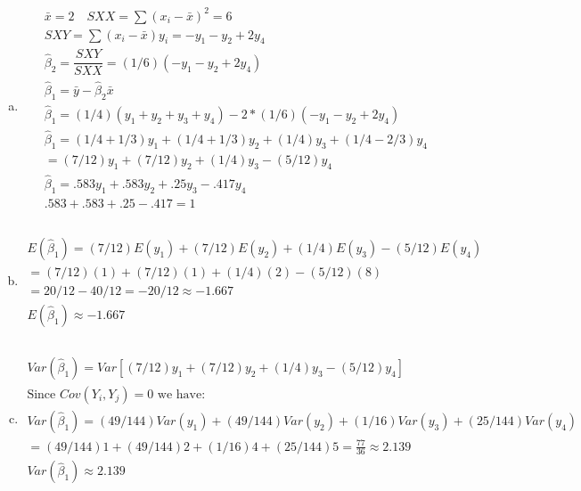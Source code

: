 \documentclass{article}
\newcommand{\hb}{\hat{\beta}}
\newcommand{\bx}{\bar{x}}
\newcommand{\by}{\bar{y}}
\begin{document}
\begin{flushleft}
\begin{enumerate}[(a)]
	
	\item 
\begin{multline*}\\
\bx =2 \quad SXX=\sum(x_i-\bx)^2=6\\
SXY=\sum(x_i-\bx)y_i=-y_1-y_2+2y_4\\
\hb_2=\dfrac{SXY}{SXX}=(1/6)(-y_1-y_2+2y_4)\\
\hb_1=\by-\hb_2 \bx\\
\hb_1=(1/4)(y_1+y_2+y_3+y_4)-2*(1/6)(-y_1-y_2+2y_4)\\
\hb_1=(1/4+1/3)y_1+(1/4+1/3)y_2+(1/4)y_3+(1/4-2/3)y_4\\
=(7/12)y_1+(7/12)y_2+(1/4)y_3-(5/12)y_4\\
\hb_1=.583y_1+.583y_2+.25y_3-.417y_4\\
.583+.583+.25-.417=1\\
\end{multline*}

	\item 
\begin{multline*}\\
E(\hb_1)=(7/12)E(y_1)+(7/12)E(y_2)+(1/4)E(y_3)-(5/12)E(y_4)\\
=(7/12)(1)+(7/12)(1)+(1/4)(2)-(5/12)(8)\\
=20/12-40/12=-20/12\approx -1.667\\
E(\hb_1)\approx -1.667\\
\end{multline*}


\item 
\begin{multline*}\\
Var(\hb_1)=Var[(7/12)y_1+(7/12)y_2+(1/4)y_3-(5/12)y_4]\\
\text{Since } Cov(Y_i,Y_j)=0 \text{ we have:}\\
Var(\hb_1)=(49/144)Var(y_1)+(49/144)Var(y_2)+(1/16)Var(y_3)+(25/144)Var(y_4)\\
=(49/144)1+(49/144)2+(1/16)4+(25/144)5=\frac{77}{36}\approx 2.139\\
Var(\hb_1)\approx 2.139\\
\end{multline*}


\end{enumerate}
\end{flushleft}
\end{document}
